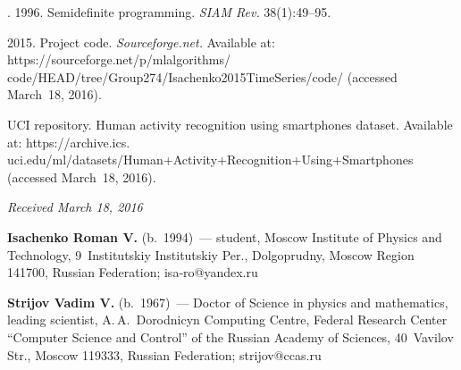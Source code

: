 \begin{multicols}{2}
{{\begin{thebibliography}{99}
.
1996.
Semidefinite programming.
\textit{SIAM Rev.} 38(1):49--95.

 2015.
Project code. \textit{Sourceforge.net.} 
Available at:
{\sf https://sourceforge.net/p/mlalgorithms/\linebreak 
code/HEAD/tree/Group274/Isachenko2015TimeSeries\linebreak /code/}
(accessed March~18, 2016).

UCI repository. Human activity recognition using smartphones dataset.
Available at:
{\sf https://archive.ics. uci.edu/ml/datasets/Human+Activity+Recognition+\linebreak Using+Smartphones}
(accessed March~18, 2016).
\end{thebibliography}

 }
 }

\end{multicols}

\vspace*{-3pt}

\hfill{\small\textit{Received March 18, 2016}}


\Contr

\noindent
\textbf{Isachenko Roman V.} (b.\ 1994)~---
 student, Moscow Institute of Physics and Technology, 
 9~Institutskiy Institutskiy Per., Dolgoprudny, Moscow Region 141700, 
 Russian Federation;   \mbox{isa-ro@yandex.ru}




\vspace*{3pt}

\noindent
\textbf{Strijov Vadim V.} (b.\ 1967)~---
Doctor of Science in physics and mathematics, leading scientist, 
A.\,A.~Dorodnicyn Computing Centre, Federal Research Center 
``Computer Science and Control'' of the Russian Academy of Sciences, 
40~Vavilov Str., Moscow 119333, Russian Federation; \mbox{strijov@ccas.ru}


\label{end\stat}


\renewcommand{\bibname}{\protect\rm Литература}